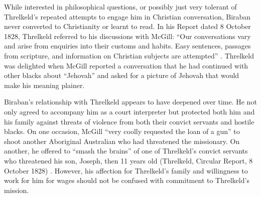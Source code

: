 While interested in philosophical questions, or possibly just very tolerant of Threlkeld’s repeated attempts to engage him in Christian conversation, Biraban never converted to Christianity or learnt to read. In his Report dated 8 October 1828, Threlkeld referred to his discussions with McGill: “Our conversations vary and arise from enquiries into their customs and habits. Easy sentences, passages from scripture, and information on Christian subjects are attempted” \citep[98]{gunson_australian_1974a}. Threlkeld was delighted when McGill reported a conversation that he had continued with other blacks about “Jehovah” and asked for a picture of Jehovah that would make his meaning plainer. 

Biraban’s relationship with Threlkeld appears to have deepened over time. He not only agreed to accompany him as a court interpreter but protected both him and his family against threats of violence from both their convict servants and hostile blacks. On one occasion, McGill “very coolly requested the loan of a gun” to shoot another Aboriginal Australian who had threatened the missionary. On another, he offered to “smash the brains” of one of Threlkeld’s convict servants who threatened his son, Joseph, then 11 years old (Threlkeld, Circular Report, 8 October 1828) \citep[99]{gunson_australian_1974a}. However, his affection for Threlkeld’s family and willingness to work for him for wages should not be confused with commitment to Threlkeld’s mission.

